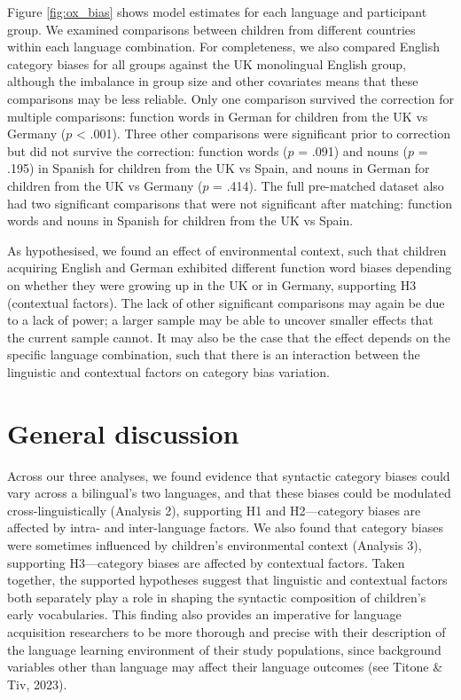 \documentclass[10pt, letterpaper]{article}
\begin{document}
Figure \ref{fig:ox_bias} shows model estimates for each language and
participant group. We examined comparisons between children from
different countries within each language combination. For completeness,
we also compared English category biases for all groups against the UK
monolingual English group, although the imbalance in group size and
other covariates means that these comparisons may be less reliable. Only
one comparison survived the correction for multiple comparisons:
function words in German for children from the UK vs Germany (\(p\)
\textless{} .001). Three other comparisons were significant prior to
correction but did not survive the correction: function words (\(p\) =
.091) and nouns (\(p\) = .195) in Spanish for children from the UK vs
Spain, and nouns in German for children from the UK vs Germany (\(p\) =
.414). The full pre-matched dataset also had two significant comparisons
that were not significant after matching: function words and nouns in
Spanish for children from the UK vs Spain.

As hypothesised, we found an effect of environmental context, such that
children acquiring English and German exhibited different function word
biases depending on whether they were growing up in the UK or in
Germany, supporting H3 (contextual factors). The lack of other
significant comparisons may again be due to a lack of power; a larger
sample may be able to uncover smaller effects that the current sample
cannot. It may also be the case that the effect depends on the specific
language combination, such that there is an interaction between the
linguistic and contextual factors on category bias variation.

\section{General discussion}\label{general-discussion}

Across our three analyses, we found evidence that syntactic category
biases could vary across a bilingual's two languages, and that these
biases could be modulated cross-linguistically (Analysis 2), supporting
H1 and H2---category biases are affected by intra- and inter-language
factors. We also found that category biases were sometimes influenced by
children's environmental context (Analysis 3), supporting H3---category
biases are affected by contextual factors. Taken together, the supported
hypotheses suggest that linguistic and contextual factors both
separately play a role in shaping the syntactic composition of
children's early vocabularies. This finding also provides an imperative
for language acquisition researchers to be more thorough and precise
with their description of the language learning environment of their
study populations, since background variables other than language may
affect their language outcomes (see Titone \& Tiv, 2023).
\end{document}
